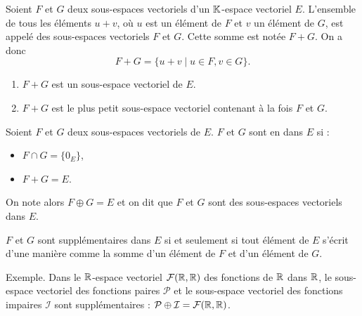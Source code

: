 \documentclass[10pt,class=article,crop=false]{standalone}
\begin{document}
\begin{multicols}{2}
\begin{definition}
	Soient $F$ et $G$ deux sous-espaces vectoriels d'un $\mathbb{K}$-espace vectoriel $E$.
	L'ensemble de tous les éléments $u+v$, où $u$ est un élément de
	$F$ et $v$ un élément de $G$, est appelé  des sous-espaces vectoriels
	$F$ et $G$. Cette somme est notée  $F+G$. On a donc
	$$F+G=\big\{u+v \mid u \in F, v \in G \big\}.$$
\end{definition}


\begin{proposition}
	\sauteligne
	\begin{enumerate}
		\item $F+G$ est un sous-espace vectoriel de $E$.
		\item $F+G$ est le plus petit sous-espace vectoriel contenant à la fois $F$ et $G$.
	\end{enumerate}
\end{proposition}


\begin{definition}
	Soient $F$ et $G$ deux sous-espaces vectoriels de $E$.
	$F$ et $G$ sont en 
	 dans $E$ si :
	\begin{itemize}
		\item $F \cap G = \{ 0_E \}$,
		\item $F+G=E$.
	\end{itemize}
	On note alors $F \oplus G=E$\index{$\oplus$} et on dit que $F$ et $G$ sont des sous-espaces vectoriels  dans $E$.
\end{definition}

\begin{proposition}
	\label{prop:directeunique}
	$F$ et $G$ sont supplémentaires dans $E$ si et seulement si tout
	élément de $E$ s'écrit d'une manière 
	comme la somme d'un élément de $F$ et d'un élément de $G$.
\end{proposition}


Exemple. 
	Dans le $\mathbb{R}$-espace vectoriel $\mathcal{F}(\mathbb{R},\mathbb{R})$
	des fonctions de $\mathbb{R}$ dans $\mathbb{R}$, le sous-espace
	vectoriel des fonctions paires $\mathcal{P}$ et le sous-espace
	vectoriel des fonctions impaires $\mathcal{I}$ sont supplémentaires :
	$\mathcal{P}\oplus\mathcal{I}=\mathcal{F}(\mathbb{R},\mathbb{R})$.



\end{multicols}
\end{document}
